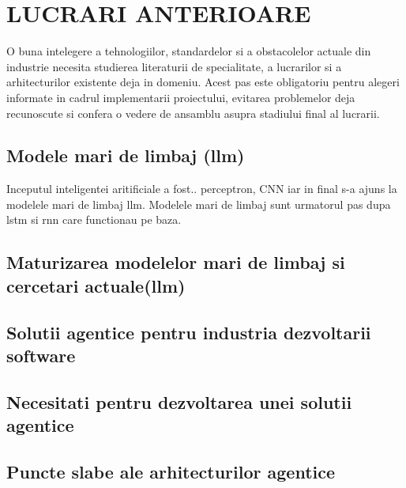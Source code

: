\documentclass[12pt, a4paper, oneside, romanian, draft]{teza-upb}
\begin{document}
\newpage


\chapter{LUCRARI ANTERIOARE}

  O buna intelegere a tehnologiilor, standardelor si a obstacolelor actuale din industrie necesita
  studierea literaturii de specialitate, a lucrarilor si a arhitecturilor existente deja in domeniu. Acest pas este
  obligatoriu pentru alegeri informate in cadrul implementarii proiectului, evitarea problemelor deja recunoscute 
  si confera o vedere de ansamblu asupra stadiului final al lucrarii.

  \section{Modele mari de limbaj (\ac{llm})}

  Inceputul inteligentei aritificiale a fost.. perceptron, CNN iar in final s-a ajuns la modelele mari de limbaj \ac{llm}.
  Modelele mari de limbaj sunt urmatorul pas dupa \ac{lstm} si \ac{rnn} care functionau pe baza.

  \section{Maturizarea modelelor mari de limbaj si cercetari actuale(\ac{llm})}


  \section{Solutii agentice pentru industria dezvoltarii software}


  \section{Necesitati pentru dezvoltarea unei solutii agentice}


  \section{Puncte slabe ale arhitecturilor agentice}

\end{document}
